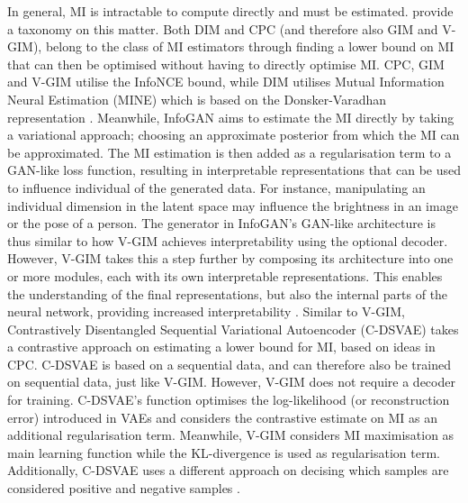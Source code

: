 	In general, MI is intractable to compute directly and must be estimated. %
	\cite{pooleVariationalBoundsMutual2019} provide a taxonomy on this matter. Both DIM and CPC (and therefore also GIM and V-GIM), belong to the class of MI estimators through finding a lower bound on MI that can then be optimised without having to directly optimise MI. CPC, GIM and V-GIM utilise the InfoNCE bound, while DIM utilises Mutual Information Neural Estimation (MINE) \citep{belghaziMINEMutualInformation2021} which is based on the Donsker-Varadhan representation \citep{donskerAsymptoticEvaluationCertain1976}. Meanwhile, InfoGAN aims to estimate the MI directly by taking a variational approach; choosing an approximate posterior from which the MI can be approximated. The MI estimation is then added as a regularisation term to a GAN-like loss function, resulting in interpretable representations that can be used to influence individual of the generated data. For instance, manipulating an individual dimension in the latent space may influence the brightness in an image or the pose of a person. The generator in InfoGAN's GAN-like architecture is thus similar to how V-GIM achieves interpretability using the optional decoder. However, V-GIM takes this a step further by composing its architecture into one or more modules, each with its own interpretable representations. This enables the understanding of the final representations, but also the internal parts of the neural network, providing increased interpretability \citep{chenInfoGANInterpretableRepresentation2016}.
	Similar to V-GIM, Contrastively Disentangled Sequential Variational Autoencoder (C-DSVAE) takes a contrastive approach on estimating a lower bound for MI, based on ideas in CPC. C-DSVAE is based on a sequential data, and can therefore also be trained on sequential data, just like V-GIM. However, V-GIM does not require a decoder for training. C-DSVAE's function optimises the log-likelihood (or reconstruction error) introduced in VAEs and considers the contrastive estimate on MI as an additional regularisation term. Meanwhile, V-GIM considers MI maximisation as main learning function while the KL-divergence is used as regularisation term. Additionally, C-DSVAE uses a different approach on decising which samples are considered positive and negative samples \cite{baiContrastivelyDisentangledSequential2021}.

	
